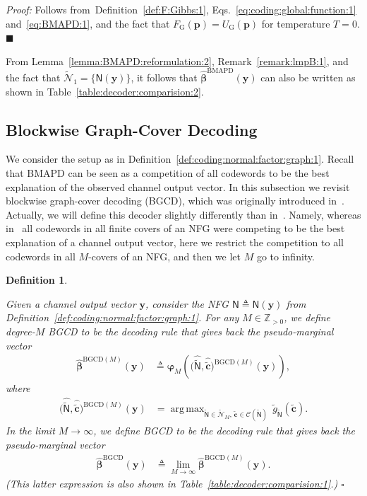 \documentclass[journal, twocolumn]{IEEEtran}
\renewcommand{\mathbf}[1]{{\bm{#1}}}
\newcommand{\Z}{\mathbb{Z}}
\newcommand{\Zpp}{\Z_{>0}}
\DeclareMathOperator*{\argmax}{arg\,max}
\newcommand{\vect}[1]{\mathbf{#1}}
\newcommand{\code}[1]{\mathcal{#1}}
\newcommand{\set}[1]{\mathcal{#1}}
\newcommand{\graph}[1]{\mathsf{#1}}
\newcommand{\defeq}{\triangleq}
\newcommand{\codeC}{\code{C}}
\newcommand{\bel}{\beta}
\newcommand{\hvbel}{\boldsymbol{\hat \bel}}
\newcommand{\hcN}{\hat{\cgraph{N}}}
\newcommand{\BGCD}{\mathrm{BGCD}}
\newcommand{\cvc}{\vect{\cover{c}}}
\newcommand{\hcvc}{\vect{\hat{\cover{c}}}}
\newcommand{\vp}{\vect{p}}
\newcommand{\BMAPD}{\mathrm{BMAPD}}
\newcommand{\vy}{\vect{y}}
\newcommand{\graphN}{\graph{N}}
\newcommand{\cover}[1]{\tilde{#1}}
\newcommand{\cset}[1]{\cover{\set{#1}}}
\newcommand{\cgraph}[1]{\cover{\graph{#1}}}
\newcommand{\?}{\mathrm{?}}
\newcommand{\varphiM}{\boldsymbol{\varphi}_{M}}
\newcommand{\qedblack}{\hspace*{\fill}%
  $\blacksquare$\smallskip}
\newcommand{\qedwhite}{\hspace*{\fill}%
  $\square$\smallskip}
\newcommand{\defend}{\qedwhite}
\newcommand{\FGibbs}{F_{\mathrm{G}}}
\newcommand{\UGibbs}{U_{\mathrm{G}}}
\newtheorem{Definition}[Lemma]{Definition}
\newenvironment{Proof}%
  {\noindent \emph{Proof:}}{\qedblack}
\begin{document}
\begin{Proof}
  Follows from~Definition~\ref{def:F:Gibbs:1},
  Eqs.~\eqref{eq:coding:global:function:1} and~\eqref{eq:BMAPD:1}, and the
  fact that $\FGibbs(\vp) = \UGibbs(\vp)$ for temperature $T = 0$.
\end{Proof}


From Lemma~\ref{lemma:BMAPD:reformulation:2}, Remark~\ref{remark:lmpB:1}, and
the fact that $\cset{N}_1 = \bigl\{ \graphN(\vy) \bigr\}$, it follows that
$\hvbel^{\BMAPD}(\vy)$ can also be written as shown in
Table~\ref{table:decoder:comparision:2}.


\subsection{Blockwise Graph-Cover Decoding}
\label{sec:BGCD:1}


We consider the setup as in
Definition~\ref{def:coding:normal:factor:graph:1}. Recall that BMAPD can be
seen as a competition of all codewords to be the best explanation of the
observed channel output vector. In this subsection we revisit blockwise
graph-cover decoding (BGCD), which was originally introduced
in~\cite[Section~4]{Vontobel:Koetter:05:1:subm}. Actually, we will define this
decoder slightly differently than
in~\cite[Section~4]{Vontobel:Koetter:05:1:subm}. Namely, whereas
in~\cite[Section~4]{Vontobel:Koetter:05:1:subm} all codewords in all finite
covers of an NFG were competing to be the best explanation of a channel output
vector, here we restrict the competition to all codewords in all $M$-covers of
an NFG, and then we let $M$ go to infinity.


\begin{Definition}
  \label{def:BGCD:1}
  
  Given a channel output vector $\vy$, consider the NFG
  $\graphN \defeq \graphN(\vy)$ from
  Definition~\ref{def:coding:normal:factor:graph:1}. For any $M \in \Zpp$, we
  define degree-$M$ BGCD to be the decoding rule that gives back the
  pseudo-marginal vector
  \begin{align*}
    \hvbel^{\BGCD(M)}(\vy)
      &\defeq
         \varphiM
           \left(
             \big( \hcN, \hcvc \big)^{\BGCD(M)}(\vy)
           \right),
  \end{align*}
  where
  \begin{align}
    \big( \hcN, \hcvc \big)^{\BGCD(M)}(\vy)
      &= \argmax_{\cgraph{N} \in \cset{N}_M, \, \cvc \in \codeC(\cgraph{N})} \,
           \cover{g}_{\cgraph{N}}(\cvc).
                 \label{eq:BGCD:1}
  \end{align}
  In the limit $M \to \infty$, we define BGCD to be the decoding rule that
  gives back the pseudo-marginal vector
  \begin{align*}
    \hvbel^{\BGCD}(\vy)
      &\defeq
         \lim_{M \to \infty}
           \hvbel^{\BGCD(M)}(\vy).
  \end{align*}
  (This latter expression is also shown in
  Table~\ref{table:decoder:comparision:1}.)
  \defend
\end{Definition}
\end{document}
